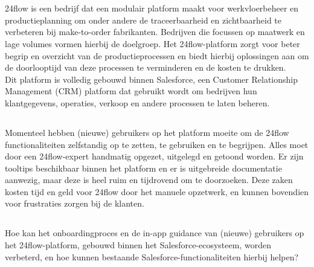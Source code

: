 
\chapter{}%
\label{ch:inleiding}

24flow is een bedrijf dat een modulair platform maakt voor werkvloerbeheer en productieplanning om onder andere de traceerbaarheid en zichtbaarheid te verbeteren bij make-to-order fabrikanten. Bedrijven die focussen op maatwerk en lage volumes vormen hierbij de doelgroep. Het 24flow-platform zorgt voor beter begrip en overzicht van de productieprocessen en biedt hierbij oplossingen aan om de doorlooptijd van deze processen te verminderen en de kosten te drukken.
\\

Dit platform is volledig gebouwd binnen Salesforce, een Customer Relationship Management (CRM) platform dat gebruikt wordt om bedrijven hun klantgegevens, operaties, verkoop en andere processen te laten beheren. 

\section{}%
\label{sec:probleemstelling}

Momenteel hebben (nieuwe) gebruikers op het platform moeite om de 24flow functionaliteiten zelfstandig op te zetten, te gebruiken en te begrijpen. Alles moet door een 24flow-expert handmatig opgezet, uitgelegd en getoond worden. Er zijn tooltips beschikbaar binnen het platform en er is uitgebreide documentatie aanwezig, maar deze is heel ruim en tijdrovend om te doorzoeken. Deze zaken kosten tijd en geld voor 24flow door het manuele opzetwerk, en kunnen bovendien voor frustraties zorgen bij de klanten.
\\

\section{}%
\label{sec:onderzoeksvraag}

Hoe kan het onboardingproces en de in-app guidance van (nieuwe) gebruikers op het 24flow-platform, gebouwd binnen het Salesforce-ecosysteem, worden verbeterd, en hoe kunnen bestaande Salesforce-functionaliteiten hierbij helpen?
\\


